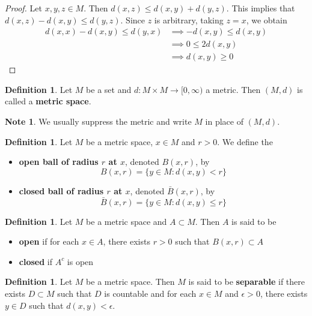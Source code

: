 \documentclass[12pt]{amsart}
\theoremstyle{definition}
\newtheorem{defn}[definition]{Definition}
\newtheorem{note}[definition]{Note}
\newcommand{\ep}{\epsilon}
\newcommand{\Rg}{[0,\infty)}
\newcommand{\ld}[1]{\label{defn:#1}}
\begin{document}
	\begin{proof}
	Let $x, y, z \in M$. Then $d(x,z) \leq d(x, y) + d(y,z)$. This implies that $d(x,z) - d(x, y) \leq d(y, z)$. Since $z$ is arbitrary, taking $z=x$, we obtain 
	\begin{align*}
	d(x,x) - d(x, y) \leq d(y, x)
	& \implies - d(x, y) \leq d(x, y) \\
	& \implies 0 \leq 2 d(x,y) \\
	& \implies d(x,y) \geq 0
	\end{align*}
	\end{proof}	

	\begin{defn} \ld{}
		Let $M$ be a set and $d: M \times M \rightarrow \Rg$ a metric. Then $(M, d)$ is called a \textbf{metric space}.
	\end{defn}	
	
	\begin{note}
		We usually suppress the metric and write $M$ in place of $(M, d)$.
	\end{note}	

	\begin{defn}
		Let $M$ be a metric space, $x \in M$ and $r > 0$. We define the 
		\begin{itemize}
			\item \textbf{open ball of radius $r$ at $x$}, denoted $B(x, r)$, by $$B(x, r) = \{y \in M: d(x,y) < r\}$$
			\item \textbf{closed ball of radius $r$ at $x$}, denoted $\bar{B}(x, r)$, by $$\bar{B}(x, r) = \{y \in M: d(x,y) \leq r\}$$
		\end{itemize}
	\end{defn}

	\begin{defn}
		Let $M$ be a metric space and $A \subset M$. Then $A$ is said to be 
		\begin{itemize}
			\item \textbf{open} if for each $x \in A$, there exists $r > 0$ such that $B(x, r) \subset A$
			\item \textbf{closed} if $A^c$ is open
		\end{itemize}  
	\end{defn}

	\begin{defn}
		Let $M$ be a metric space. Then $M$ is said to be \textbf{separable} if there exists $D \subset M$ such that $D$ is countable and for each $x \in M$ and $\ep >0$, there exists $y \in D$ such that $d(x, y) < \ep$.
	\end{defn}
	
\end{document}
